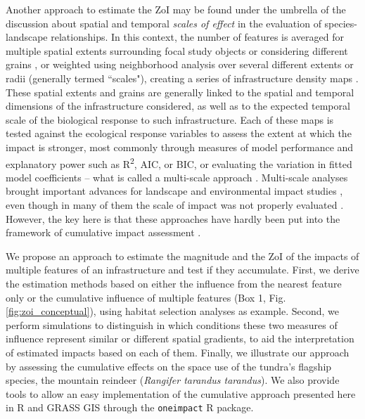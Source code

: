 \documentclass[titlepage]{article}
\begin{document}
Another approach to estimate the ZoI may be found under the umbrella of the discussion about spatial and temporal \textit{scales of effect} in the evaluation of species-landscape relationships. In this context, the number of features is averaged for multiple spatial extents surrounding focal study objects \citep{jackson_are_2015} or considering different grains \citep{laforge_process-focussed_2015}, or weighted using neighborhood analysis over several different extents or radii (generally termed ``scales"), creating a series of infrastructure density maps \citep{mcgarigal_multi-scale_2016}. These spatial extents and grains are generally linked to the spatial and temporal dimensions of the infrastructure considered, as well as to the expected temporal scale of the biological response to such infrastructure. Each of these maps is tested against the ecological response variables to assess the extent at which the impact is stronger, most commonly through measures of model performance and explanatory power such as R\textsuperscript{2}, AIC, or BIC, or evaluating the variation in fitted model coefficients \citep{jackson_are_2015, huais_multifit_2018} -- what is called a multi-scale approach \citep[e.g.][]{zeller_multi-level_2017}.
Multi-scale analyses brought important advances for landscape and environmental impact studies \citep[e.g.][]{mcgarigal_multi-scale_2016}, even though in many of them the scale of impact was not properly evaluated \citep{jackson_are_2015}. However, the key here is that these approaches have hardly been put into the framework of cumulative impact assessment \citep[but see][]{polfus_identifying_2011}.

We propose an approach to estimate the magnitude and the ZoI of the impacts of multiple features of an infrastructure and test if they accumulate. First, we derive the estimation methods based on either the influence from the nearest feature only or the cumulative influence of multiple features (Box 1, Fig. \ref{fig:zoi_conceptual}), using habitat selection analyses as example. Second, we perform simulations to distinguish in which conditions these two measures of influence represent similar or different spatial gradients, to aid the interpretation of estimated impacts based on each of them. 
Finally, we illustrate our approach by assessing the cumulative effects on the space use of the tundra's flagship species, the mountain reindeer (\textit{Rangifer tarandus tarandus}). We also provide tools to allow an easy implementation of the cumulative approach presented here in R \citep{r_core_team_r_2020} and GRASS GIS \citep{grass_development_team_geographic_2017} through the \verb|oneimpact| R package.
\end{document}
